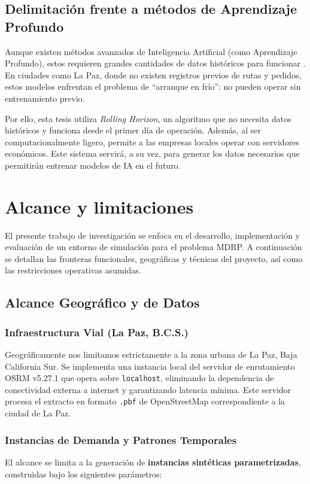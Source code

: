 \documentclass[12pt,letterpaper,oneside]{book}
\begin{document}
\subsection{Delimitación frente a métodos de Aprendizaje Profundo}
Aunque existen métodos avanzados de Inteligencia Artificial (como Aprendizaje Profundo), estos requieren grandes
cantidades de datos históricos para funcionar \citep{Lin2018GreedRL}. En ciudades como La Paz, donde no existen registros previos de rutas
y pedidos, estos modelos enfrentan el problema de \textquotedblleft arranque en frío\textquotedblright: no pueden operar sin entrenamiento previo.

Por ello, esta tesis utiliza \textit{Rolling Horizon}, un algoritmo que no necesita datos históricos y funciona desde
el primer día de operación. Además, al ser computacionalmente ligero, permite a las empresas locales operar con 
servidores económicos. Este sistema servirá, a su vez, para generar los datos necesarios que permitirán entrenar 
modelos de IA en el futuro.

\section{Alcance y limitaciones}

El presente trabajo de investigación se enfoca en el desarrollo, implementación y evaluación de 
un entorno de simulación para el problema MDRP. A continuación se detallan las fronteras funcionales, 
geográficas y técnicas del proyecto, así como las restricciones operativas asumidas.

\subsection{Alcance Geográfico y de Datos}
\subsubsection{Infraestructura Vial (La Paz, B.C.S.)}
Geográficamente nos limitamos estrictamente a la zona urbana de La Paz, Baja California Sur. Se 
implementa una instancia local del servidor de enrutamiento OSRM v5.27.1 que opera sobre
\texttt{localhost}, eliminando la dependencia de conectividad externa a internet y garantizando 
latencia mínima. Este servidor procesa el extracto en formato \texttt{.pbf} de 
OpenStreetMap correspondiente a la ciudad de La Paz.

\subsubsection{Instancias de Demanda y Patrones Temporales}
El alcance se limita a la generación de \textbf{instancias sintéticas parametrizadas}, construidas bajo
los siguientes parámetros:
\end{document}

